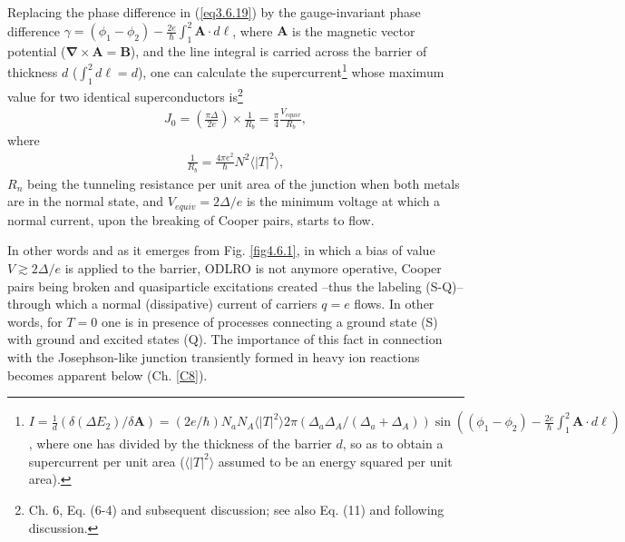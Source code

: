 Replacing the phase difference in (\ref{eq3.6.19}) by the gauge-invariant phase difference $\gamma=(\phi_1-\phi_2)-\frac{2e}{\hbar}\int_1^2\mathbf A\cdot d\pmb \ell$, where $\mathbf A$ is the magnetic vector potential ($\pmb\nabla\times\mathbf A=\mathbf B$), and the line integral is carried across the barrier of thickness $d$ ($\int_1^2d\ell=d$), one can calculate the supercurrent\footnote{$I=\frac{1}{d}\left(\delta(\Delta E_2)/\delta\mathbf A\right)=\left(2e/\hbar\right)N_aN_A\langle|T|^2\rangle2\pi(\Delta_a\Delta_A/(\Delta_a+\Delta_A))\sin\left((\phi_1-\phi_2)-\frac{2e}{\hbar}\int_1^2\mathbf A\cdot d\pmb \ell\right)$, where one has divided by the thickness of the barrier $d$, so as to obtain a supercurrent per unit area ($\langle|T|^2\rangle$ assumed to be an energy squared per unit area).} whose maximum value for two identical superconductors is\footnote{\cite{Tinkham:96} Ch. 6, Eq. (6-4) and subsequent discussion; see also \cite{Anderson:64} Eq. (11) and following discussion.}
\begin{align}\label{eq4.7.20}
J_0=\left(\frac{\pi\Delta}{2e}\right)\times\frac{1}{R_b}=\frac{\pi}{4}\frac{V_{equiv}}{R_b},
\end{align}
where
\begin{align}\label{eq4.7.21}
\frac{1}{R_b}=\frac{4\pi e^2}{\hbar}N^2\langle|T|^2\rangle,
\end{align}
  $R_n$ being the tunneling resistance per unit area of the junction when both metals are in the normal state, and $V_{equiv}=2\Delta/e$ is the minimum voltage at which a normal current, upon the breaking of Cooper pairs, starts to flow. 
  
  In other words and as it emerges from Fig. \ref{fig4.6.1}, in which a bias of value $V\gtrsim2\Delta/e$ is applied to the barrier, ODLRO is not anymore operative, Cooper pairs being broken and quasiparticle excitations created --thus the labeling (S-Q)-- through which a normal (dissipative) current of carriers $q=e$ flows. In other words, for $T=0$ one is in presence of processes connecting a ground state (S) with ground and excited states (Q). The importance of this fact in connection with the Josephson-like junction transiently formed in heavy ion reactions becomes apparent below (Ch. \ref{C8}).
  
